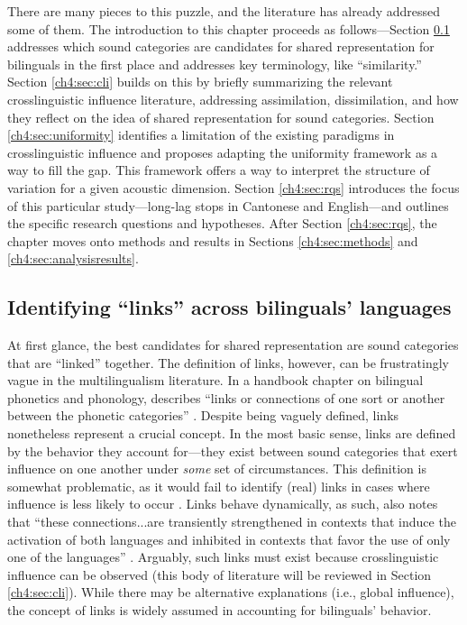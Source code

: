 There are many pieces to this puzzle, and the literature has already addressed some of them. The introduction to this chapter proceeds as follows---Section \ref{ch4:sec:links} addresses which sound categories are candidates for shared representation for bilinguals in the first place and addresses key terminology, like ``similarity.'' Section \ref{ch4:sec:cli} builds on this by briefly summarizing the relevant crosslinguistic influence literature, addressing assimilation, dissimilation, and how they reflect on the idea of shared representation for sound categories. Section \ref{ch4:sec:uniformity} identifies a limitation of the existing paradigms in crosslinguistic influence and proposes adapting the uniformity framework as a way to fill the gap. This framework offers a way to interpret the structure of variation for a given acoustic dimension. Section \ref{ch4:sec:rqs} introduces the focus of this particular study---long-lag stops in Cantonese and English---and outlines the specific research questions and hypotheses. After Section \ref{ch4:sec:rqs}, the chapter moves onto methods and results in Sections \ref{ch4:sec:methods} and \ref{ch4:sec:analysisresults}.

\subsection{Identifying ``links'' across bilinguals' languages}\label{ch4:sec:links}

At first glance, the best candidates for shared representation are sound categories that are ``linked'' together. The definition of links, however, can be frustratingly vague in the multilingualism literature. In a handbook chapter on bilingual phonetics and phonology, \citeauthor{simonet_2016_bilingualism} describes ``links or connections of one sort or another between the phonetic categories'' \citeyearpar[][p. 10]{simonet_2016_bilingualism}. Despite being vaguely defined, links nonetheless represent a crucial concept. In the most basic sense, links are defined by the behavior they account for---they exist between sound categories that exert influence on one another under \textit{some} set of circumstances. This definition is somewhat problematic, as it would fail to identify (real) links in cases where influence is less likely to occur \citep[see][]{grosjean_2011_transfer}. Links behave dynamically, as such,  \citeauthor{simonet_2016_bilingualism} also notes that ``these connections...are transiently strengthened in contexts that induce the activation of both languages and inhibited in contexts that favor the use of only one of the languages'' \citeyearpar[][p. 10]{simonet_2016_bilingualism}. Arguably, such links must exist because crosslinguistic influence can be observed (this body of literature will be reviewed in Section \ref{ch4:sec:cli}). While there may be alternative explanations (i.e., global influence), the concept of links is widely assumed in accounting for bilinguals' behavior. 

